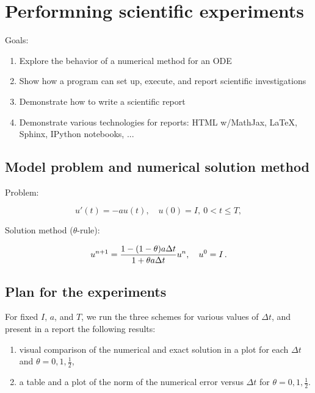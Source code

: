 \documentclass[%
oneside,                 %
final,                   %
10pt]{article}
\begin{document}
\section*{Performning scientific experiments}
\label{decay:experiments}

 

Goals:

\begin{enumerate}
\item Explore the behavior of a numerical method for an ODE

\item Show how a program can set up, execute, and report scientific investigations

\item Demonstrate how to write a scientific report

\item Demonstrate various technologies for reports: HTML w/MathJax, {\LaTeX}, Sphinx, IPython notebooks, ...
\end{enumerate}

\noindent
\subsection*{Model problem and numerical solution method}

Problem:

\begin{equation}
u'(t) = -au(t),\quad u(0)=I,\ 0< t \leq T,
\label{decay:experiments:model}
\end{equation}

Solution method ($\theta$-rule):

\[
u^{n+1} = \frac{1 - (1-\theta) a\Delta t}{1 + \theta a\Delta t}u^n,
\quad u^0=I\tp
\]

\subsection*{Plan for the experiments}

For fixed $I$, $a$, and $T$, we run the three schemes for various
values of $\Delta t$, and present in a report the following results:

\begin{enumerate}
\item visual comparison of the numerical and exact solution in a plot for
   each $\Delta t$ and $\theta=0,1,\frac{1}{2}$,

\item a table and a plot of the norm of the numerical error versus $\Delta t$
   for $\theta=0,1,\frac{1}{2}$.
\end{enumerate}
\end{document}
